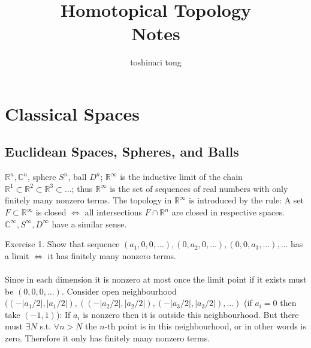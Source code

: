 \documentclass{article}
\title{Homotopical Topology\\Notes}
\author{toshinari tong}
\begin{document}
\maketitle
\section{Classical Spaces}
\subsection{Euclidean Spaces, Spheres, and Balls}
\(\mathbb{R}^{n}, \mathbb{C}^{n}\), sphere \(S^{n}\), ball \(D^{n}\); \(\mathbb{R^{\infty}}\) is the inductive limit of the 
chain \(\mathbb{R}^{1}\subset\mathbb{R}^{2}\subset\mathbb{R}^{3}\subset...\); thus \(\mathbb{R}^{\infty}\) is the set of 
sequences of real numbers with only finitely many nonzero terms. The topology in \(\mathbb{R}^{\infty}\) is introduced by the 
rule: A set \(F\subset\mathbb{R}^{\infty}\) is closed \(\Longleftrightarrow\) all intersections \(F\cap\mathbb{R}^{n}\) are 
closed in respective spaces. \(\mathbb{C}^{\infty},S^{\infty},D^{\infty}\) have a similar sense.
\begin{siderules}\color{blue}Exercise 1. Show that sequence \((a_{1},0,0,...),(0,a_{2},0,...),(0,0,a_{3},...),...\) 
has a limit \(\Longleftrightarrow\) it has finitely many nonzero terms.\color{black}
\\\\
Since in each dimension it is nonzero at most once the limit point if it exists must be \((0, 0, 0,...)\). Consider open 
neighbourhood \(((-|a_{1}/2|, |a_{1}/2|), ((-|a_{2}/2|, |a_{2}/2|),(-|a_{3}/2|,|a_{3}/2|),...)\) (if \(a_{i} =0\) then take 
\((-1,1)\)): If \(a_{i}\) is nonzero then it is outside this neighbourhood. But there must \(\exists N\) s.t. \(\forall n>N\) 
the \(n\)-th point is in this neighbourhood, or in other words is zero. Therefore it only has finitely many nonzero terms.
\end{siderules}
\end{document}
